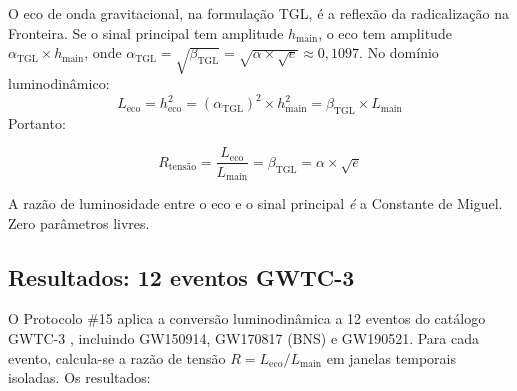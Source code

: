 \documentclass[12pt,a4paper,twoside]{article}
\newcommand{\betatgl}{\beta_{\!\scriptscriptstyle\mathrm{TGL}}}
\begin{document}
O eco de onda gravitacional, na formulação TGL, é a reflexão da radicalização na Fronteira. Se o sinal principal tem amplitude $h_{\text{main}}$, o eco tem amplitude $\alpha_{\text{TGL}} \times h_{\text{main}}$, onde $\alpha_{\text{TGL}} = \sqrt{\betatgl} = \sqrt{\alpha \times \sqrt{e}} \approx 0{,}1097$. No domínio luminodinâmico:
%
\begin{equation}
L_{\text{eco}} = h_{\text{eco}}^2 = (\alpha_{\text{TGL}})^2 \times h_{\text{main}}^2 = \betatgl \times L_{\text{main}}
\end{equation}
%
Portanto:
%
\begin{equationbox}[title={Razão de tensão}]
\begin{equation}
R_{\text{tensão}} = \frac{L_{\text{eco}}}{L_{\text{main}}} = \betatgl = \alpha \times \sqrt{e}
\label{eq:R_tensao}
\end{equation}
\end{equationbox}
%
A razão de luminosidade entre o eco e o sinal principal \textit{é} a Constante de Miguel. Zero parâmetros livres.


\subsection{Resultados: 12 eventos GWTC-3}

O Protocolo \#15 aplica a conversão luminodinâmica a 12 eventos do catálogo GWTC-3 \cite{GWTC3}, incluindo GW150914, GW170817 (BNS) e GW190521. Para cada evento, calcula-se a razão de tensão $R = L_{\text{eco}}/L_{\text{main}}$ em janelas temporais isoladas. Os resultados:
\end{document}
